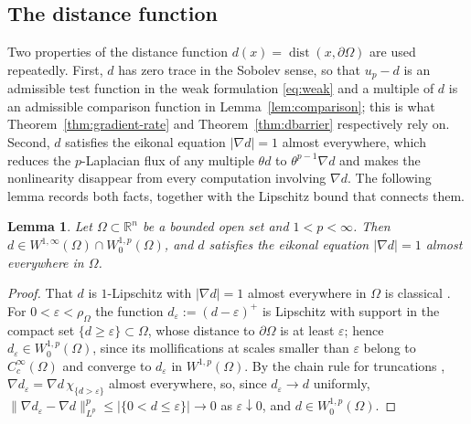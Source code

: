 \documentclass[11pt]{article}
\newcommand{\R}{\mathbb R}
\newcommand{\abs}[1]{\lvert #1\rvert}
\newcommand{\norm}[1]{\lVert #1\rVert}
\newcommand{\dist}{\operatorname{dist}}
\newtheorem{lemma}[theorem]{Lemma}
\theoremstyle{definition}
\theoremstyle{remark}
\begin{document}
\subsection{The distance function}
 Two properties of the distance function $d(x)=\dist(x,\partial\Omega)$ are
used repeatedly. First, $d$ has zero trace in the Sobolev sense, so that
$u_p-d$ is an admissible test function in the weak formulation
\eqref{eq:weak} and a multiple of $d$ is an admissible comparison function in
Lemma~\ref{lem:comparison}; this is what Theorem~\ref{thm:gradient-rate}
and Theorem~\ref{thm:dbarrier} respectively rely on. Second, $d$ satisfies
the eikonal equation $\abs{\nabla d}=1$ almost everywhere, which reduces the
$p$-Laplacian flux of any multiple $\theta d$ to $\theta^{p-1}\nabla d$ and
makes the nonlinearity disappear from every computation involving
$\nabla d$. The following lemma records both facts, together with the
Lipschitz bound that connects them.
\begin{lemma} \label{lem:d-in-W1p}
Let $\Omega\subset\R^n$ be a bounded open set and $1<p<\infty$. Then
$d\in W^{1,\infty}(\Omega)\cap W^{1,p}_0(\Omega)$, and $d$ satisfies the
eikonal equation $\abs{\nabla d}=1$ almost everywhere in $\Omega$.
\end{lemma}
\begin{proof}
That $d$ is $1$-Lipschitz with $\abs{\nabla d}=1$ almost everywhere in
$\Omega$ is classical \cite[Chapter~3]{CS}. For $0<\varepsilon<\rho_\Omega$ the function
$d_\varepsilon:=(d-\varepsilon)^+$ is Lipschitz with support in the compact
set $\{d\ge\varepsilon\}\subset\Omega$, whose distance to $\partial\Omega$ is
at least $\varepsilon$; hence $d_\varepsilon\in W^{1,p}_0(\Omega)$, since its
mollifications at scales smaller than $\varepsilon$ belong to
$C_c^\infty(\Omega)$ and converge to $d_\varepsilon$ in $W^{1,p}(\Omega)$. By
the chain rule for truncations \cite[Lemma~7.6]{GT},
$\nabla d_\varepsilon=\nabla d\,\chi_{\{d>\varepsilon\}}$ almost everywhere,
so, since $d_\varepsilon\to d$ uniformly,
$\norm{\nabla d_\varepsilon-\nabla d}^p_{L^p}
\le\abs{\{0<d\le\varepsilon\}}\to0$ as $\varepsilon\downarrow0$, and
$d\in W^{1,p}_0(\Omega)$.
\end{proof}
\end{document}
